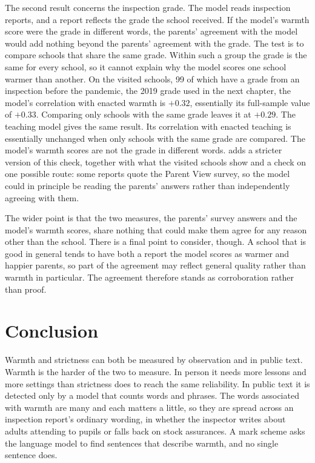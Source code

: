 The second result concerns the inspection grade. The model reads inspection reports, and a report reflects the grade the school received. If the model's warmth score were the grade in different words, the parents' agreement with the model would add nothing beyond the parents' agreement with the grade. The test is to compare schools that share the same grade. Within such a group the grade is the same for every school, so it cannot explain why the model scores one school warmer than another. On the visited schools, 99 of which have a grade from an inspection before the pandemic, the 2019 grade used in the next chapter, the model's correlation with enacted warmth is $+0.32$, essentially its full-sample value of $+0.33$. Comparing only schools with the same grade leaves it at $+0.29$. The teaching model gives the same result. Its correlation with enacted teaching is essentially unchanged when only schools with the same grade are compared. The model's warmth scores are not the grade in different words.  adds a stricter version of this check, together with what the visited schools show and a check on one possible route: some reports quote the Parent View survey, so the model could in principle be reading the parents' answers
rather than independently agreeing with them.

The wider point is that the two measures, the parents' survey answers and the model's warmth scores, share nothing that could make them agree for any reason other than the school.
There is a final point to consider, though.
A school that is good in general tends to have both a report the model scores as warmer and happier parents, so
part of the agreement may reflect general quality rather than warmth in particular. The
agreement therefore stands as corroboration rather than proof.

\section{Conclusion}
\label{sec:p1_conclusion}

Warmth and strictness can both be measured by observation and in public text. Warmth is the harder
of the two to measure. In person it needs more lessons and more settings than
strictness does to reach the same reliability. In public text it is detected only by a model that counts words and phrases. The words associated with warmth are many and each matters a little, so they are spread across an inspection report's ordinary wording, in whether the inspector
writes about adults attending to pupils or falls back on stock assurances. A mark scheme asks the language model to find sentences that describe warmth, and no single sentence does.

